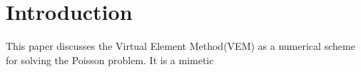 \documentclass[class=article, crop=false]{standalone}
\begin{document}
\section{Introduction}

This paper discusses the Virtual Element Method(VEM) as a numerical scheme for solving the Poisson problem. It is a mimetic 
\end{document}
